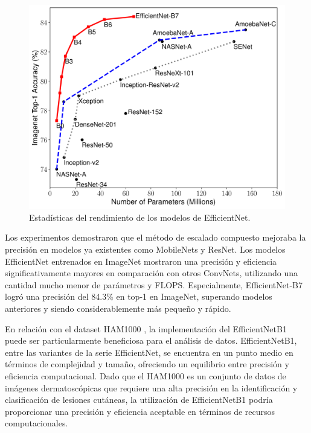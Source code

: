    \begin{figure}[ht]%
      \begin{center}
      \includegraphics[width=1\textwidth]{./Graphics/efficientnet_performance.png}
      \caption{Estadísticas del rendimiento de los modelos de EfficientNet.}
      \label{fig:efficientnet_performance}
      \end{center}
      \end{figure}

Los experimentos demostraron que el método de escalado compuesto mejoraba la precisión en modelos ya existentes como MobileNets y ResNet. Los modelos EfficientNet entrenados en ImageNet mostraron una precisión y eficiencia significativamente mayores en comparación con otros ConvNets, utilizando una cantidad mucho menor de parámetros y FLOPS. Especialmente, EfficientNet-B7 logró una precisión del 84.3\% en top-1 en ImageNet, superando modelos anteriores y siendo considerablemente más pequeño y rápido.

En relación con el dataset HAM1000 , la implementación del EfficientNetB1 puede ser particularmente beneficiosa para el análisis de datos. EfficientNetB1, entre las variantes de la serie EfficientNet, se encuentra en un punto medio en términos de complejidad y tamaño, ofreciendo un equilibrio entre precisión y eficiencia computacional. Dado que el HAM1000 es un conjunto de datos de imágenes dermatoscópicas que requiere una alta precisión en la identificación y clasificación de lesiones cutáneas, la utilización de EfficientNetB1 podría proporcionar una precisión y eficiencia aceptable en términos de recursos computacionales.


